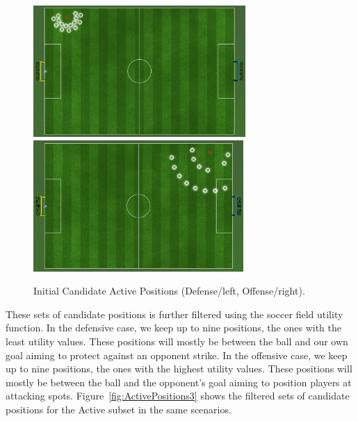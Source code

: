 \begin{figure}[t!]
\centering
  \includegraphics[height=5cm, clip, trim=0cm 10cm 20cm 0cm]{Chapter4/figures/ActiveBefore(-8,6).png} \	
  \includegraphics[height=5cm, clip, trim=20cm 10cm 0cm 0cm]{Chapter4/figures/ActiveBefore(8,6).png}
  \caption{Initial Candidate Active Positions (Defense/left, Offense/right).} 
  \label{fig:ActivePositions2}
\end{figure}

These sets of candidate positions is further filtered using the soccer field utility function. In the defensive case, we keep up to nine positions, the ones with the least utility values. These positions will mostly be between the ball and our own goal aiming to protect against an opponent strike. In the offensive case, we keep up to nine positions, the ones with the highest utility values. These positions will mostly be between the ball and the opponent's goal aiming to position players at attacking spots. Figure~\ref{fig:ActivePositions3} shows the filtered sets of candidate positions for the Active subset in the same scenarios.



